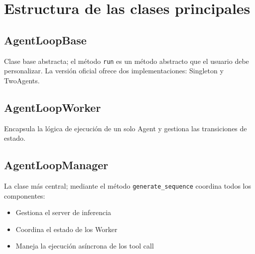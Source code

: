 \section{Estructura de las clases principales}
\subsection{AgentLoopBase}
Clase base abstracta; el método \texttt{run} es un método abstracto que el usuario debe personalizar. La versión oficial ofrece dos implementaciones: Singleton y TwoAgents.

\subsection{AgentLoopWorker}
Encapsula la lógica de ejecución de un solo Agent y gestiona las transiciones de estado.

\subsection{AgentLoopManager}
La clase más central; mediante el método \texttt{generate\_sequence} coordina todos los componentes:
\begin{itemize}
  \item Gestiona el server de inferencia
  \item Coordina el estado de los Worker
  \item Maneja la ejecución asíncrona de los tool call
\end{itemize}

